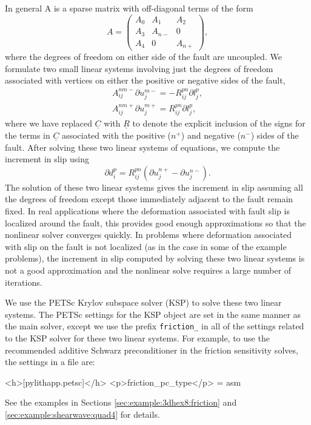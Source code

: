 In general A is a sparse matrix with off-diagonal terms of the form
\begin{equation}
A=\left(\begin{array}{ccc}
A_{0} & A_{1} & A_{2}\\
A_{3} & A_{n-} & 0\\
A_{4} & 0 & A_{n+}
\end{array}\right),
\end{equation}
where the degrees of freedom on either side of the fault are uncoupled.
We formulate two small linear systems involving just the degrees of
freedom associated with vertices on either the positive or negative
sides of the fault,
\begin{gather}
A_{ij}^{nm-}\partial u_{j}^{m-}=-R_{ij}^{pn}\partial l_{j}^{p},\\
A_{ij}^{nm+}\partial u_{j}^{m+}=R_{ij}^{pn}\partial l_{j}^{p},
\end{gather}
where we have replaced $\underline{C}$ with $\underline{R}$ to denote
the explicit inclusion of the signs for the terms in $\underline{C}$
associated with the positive ($n^{+}$) and negative ($n^{-}$) sides
of the fault. After solving these two linear systems of equations,
we compute the increment in slip using
\begin{equation}
\partial d_{i}^{p}=R_{ij}^{pn}(\partial u_{j}^{n+}-\partial u_{j}^{n-}).
\end{equation}
The solution of these two linear systems gives the increment in slip
assuming all the degrees of freedom except those immediately adjacent
to the fault remain fixed. In real applications where the deformation
associated with fault slip is localized around the fault, this provides
good enough approximations so that the nonlinear solver converges
quickly. In problems where deformation associated with slip on the
fault is not localized (as in the case in some of the example problems),
the increment in slip computed by solving these two linear systems
is not a good approximation and the nonlinear solve requires a large
number of iterations.

We use the PETSc Krylov subspace solver (KSP) to solve these two linear
systems. The PETSc settings for the KSP object are set in the same
manner as the main solver, except we use the prefix \texttt{friction\_}
in all of the settings related to the KSP solver for these two linear
systems. For example, to use the recommended additive Schwarz preconditioner
in the friction sensitivity solves, the settings in a 
file are:
\begin{cfg}
<h>[pylithapp.petsc]</h>
<p>friction_pc_type</p> = asm
\end{cfg}
See the examples in Sections \vref{sec:example:3dhex8:friction}
and \vref{sec:example:shearwave:quad4} for details.


